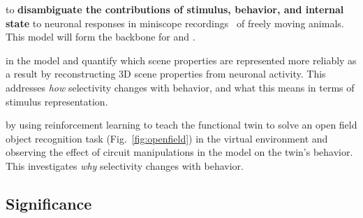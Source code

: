 \documentclass[B2,COG]{ercgrant}
\begin{document}
 \textbf{\oonetitle} to \textbf{disambiguate the contributions of stimulus, behavior, and internal state} to neuronal responses in miniscope recordings~\parencite[see Fig.~\ref{fig:miniscope}]{Cai2016-rh} of freely moving animals. This model will form the backbone for  and .

 \textbf{\otwotitle} in the model and quantify which scene properties are represented more reliably as a result by reconstructing 3D scene properties from neuronal activity. This addresses \textit{how} selectivity changes with behavior, and what this means in terms of stimulus representation. 

 \textbf{\othreetitle} by using reinforcement learning to teach the functional twin to solve an open field object recognition task (Fig.~\ref{fig:openfield}) in the virtual environment and observing the effect of circuit manipulations in the model on the twin's behavior. 
This investigates \textit{why} selectivity changes with behavior.

\subsection{Significance}
\end{document}
